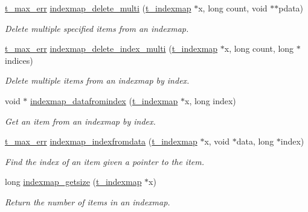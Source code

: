 \begin{DoxyCompactItemize}
\hyperlink{group__datatypes_ga73edaae82b318855cc09fac994918165}{t\_\-max\_\-err} \hyperlink{group__indexmap_ga657452348b363af34acfaeff3a536578}{indexmap\_\-delete\_\-multi} (\hyperlink{structt__indexmap}{t\_\-indexmap} $\ast$x, long count, void $\ast$$\ast$pdata)
\begin{DoxyCompactList}\small\item\em Delete multiple specified items from an indexmap. \item\end{DoxyCompactList}\item 
\hyperlink{group__datatypes_ga73edaae82b318855cc09fac994918165}{t\_\-max\_\-err} \hyperlink{group__indexmap_gad626671799012e2da71476fd99bdec67}{indexmap\_\-delete\_\-index\_\-multi} (\hyperlink{structt__indexmap}{t\_\-indexmap} $\ast$x, long count, long $\ast$indices)
\begin{DoxyCompactList}\small\item\em Delete multiple items from an indexmap by index. \item\end{DoxyCompactList}\item 
void $\ast$ \hyperlink{group__indexmap_gafca8c58c30ecb6e128209e8df80a51c0}{indexmap\_\-datafromindex} (\hyperlink{structt__indexmap}{t\_\-indexmap} $\ast$x, long index)
\begin{DoxyCompactList}\small\item\em Get an item from an indexmap by index. \item\end{DoxyCompactList}\item 
\hyperlink{group__datatypes_ga73edaae82b318855cc09fac994918165}{t\_\-max\_\-err} \hyperlink{group__indexmap_gab8e003b8468a0e4b1f5b0a16b18a9652}{indexmap\_\-indexfromdata} (\hyperlink{structt__indexmap}{t\_\-indexmap} $\ast$x, void $\ast$data, long $\ast$index)
\begin{DoxyCompactList}\small\item\em Find the index of an item given a pointer to the item. \item\end{DoxyCompactList}\item 
long \hyperlink{group__indexmap_ga95b1d9e5d527db93141e56b86413aad2}{indexmap\_\-getsize} (\hyperlink{structt__indexmap}{t\_\-indexmap} $\ast$x)
\begin{DoxyCompactList}\small\item\em Return the number of items in an indexmap. \item\end{DoxyCompactList}\item 
$$
\end{DoxyCompactItemize}
